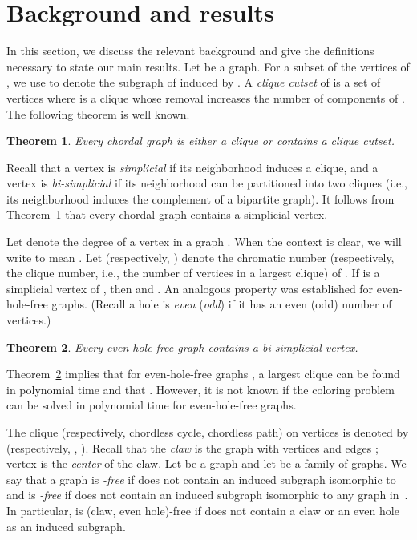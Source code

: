 \documentclass[11pt,a4paper]{article}
\newtheorem{theorem} {Theorem}[section]
\begin{document}
\section{Background and results}\label{sec:definitions}
In this section, we discuss the relevant background and give
the definitions necessary to state our main results.  Let  be a
graph. For a subset  of the vertices of , we use 
to denote the subgraph of  induced by .  A {\em clique cutset} of  is a set  of vertices where
 is a clique whose
removal increases the number of components of . The following theorem is well known.
\begin{theorem}\label{thm:dirac}{\rm \cite{Dir1961}}
Every chordal graph is either a clique or contains a clique
cutset.
\end{theorem}
Recall that a vertex is \emph{simplicial} if its neighborhood
induces a clique,  and a vertex is \emph{bi-simplicial} if its
neighborhood can be partitioned into two cliques (i.e., its
neighborhood induces the complement of a bipartite graph). It
follows from Theorem~\ref{thm:dirac} that every chordal graph
contains a simplicial vertex.

Let  denote the degree of a vertex  in a graph .
When the context is clear, we will write  to mean .
Let  (respectively, ) denote the chromatic
number (respectively, the clique number, i.e., the number of
vertices in a largest clique) of . If  is a simplicial
vertex of , then  and
. An analogous property
was established for even-hole-free graphs. (Recall a hole is {\it
even} ({\it odd}) if it has an even (odd) number of vertices.)
\begin{theorem}\label{thm:A}{\rm \cite{AddChu2008}} Every
even-hole-free graph contains a bi-simplicial vertex.
\end{theorem}
Theorem~\ref{thm:A} implies that for even-hole-free graphs ,
a largest clique can be found in polynomial time and that . However,
it is not known if the coloring problem can be solved in polynomial time for even-hole-free
graphs.

The clique (respectively, chordless cycle, chordless path) on 
vertices is denoted by  (respectively, , ). Recall that the
{\it claw} is the graph with vertices  and edges
;  vertex  is the {\em center} of the claw.
Let   be a graph and let  be a family of graphs. We say that a graph
 is {\em -free} if  does not contain
an induced subgraph isomorphic to  and  is {\em -free}
if  does not contain an induced subgraph isomorphic to any graph in~.
In particular,  
is (claw, even hole)-free if  does not contain a claw or an
even hole as an induced subgraph.
\end{document}
